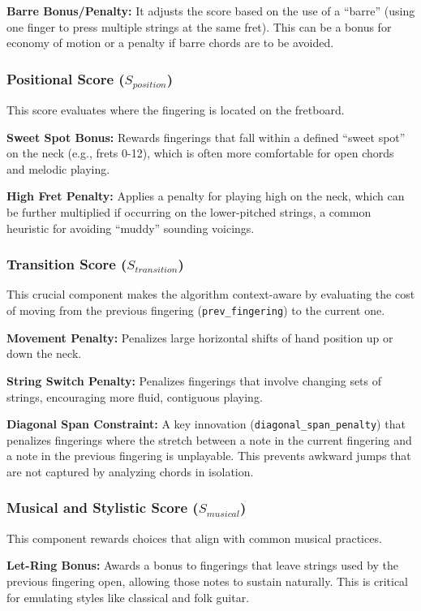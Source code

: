 \documentclass[conference]{IEEEtran}
\begin{document}
\textbf{Barre Bonus/Penalty:} It adjusts the score based on the use of a ``barre'' (using one finger to press multiple strings at the same fret). This can be a bonus for economy of motion or a penalty if barre chords are to be avoided.

\subsubsection{Positional Score ($S_{position}$)}
This score evaluates where the fingering is located on the fretboard.

\textbf{Sweet Spot Bonus:} Rewards fingerings that fall within a defined ``sweet spot'' on the neck (e.g., frets 0-12), which is often more comfortable for open chords and melodic playing.

\textbf{High Fret Penalty:} Applies a penalty for playing high on the neck, which can be further multiplied if occurring on the lower-pitched strings, a common heuristic for avoiding ``muddy'' sounding voicings.

\subsubsection{Transition Score ($S_{transition}$)}
This crucial component makes the algorithm context-aware by evaluating the cost of moving from the previous fingering (\texttt{prev\_fingering}) to the current one.

\textbf{Movement Penalty:} Penalizes large horizontal shifts of hand position up or down the neck.

\textbf{String Switch Penalty:} Penalizes fingerings that involve changing sets of strings, encouraging more fluid, contiguous playing.

\textbf{Diagonal Span Constraint:} A key innovation (\texttt{diagonal\_span\_penalty}) that penalizes fingerings where the stretch between a note in the current fingering and a note in the previous fingering is unplayable. This prevents awkward jumps that are not captured by analyzing chords in isolation.

\subsubsection{Musical and Stylistic Score ($S_{musical}$)}
This component rewards choices that align with common musical practices.

\textbf{Let-Ring Bonus:} Awards a bonus to fingerings that leave strings used by the previous fingering open, allowing those notes to sustain naturally. This is critical for emulating styles like classical and folk guitar.
\end{document}
